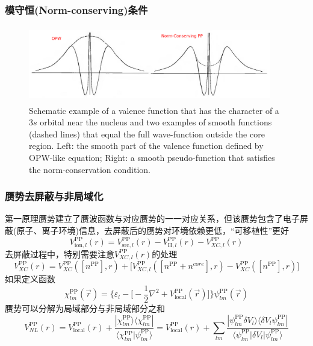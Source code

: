 \documentclass[cjk,slidestop,compress,mathserif,blue]{beamer}
\begin{document}
\frame
{
	\frametitle{模守恒\textrm{(Norm-conserving)}条件}
\begin{figure}[h!]
\centering
\vspace*{-0.10in}
\includegraphics[height=1.30in,width=4.17in,viewport=0 0 1150 350,clip]{Figures/Pseudo-OPW_NCPP.png}
\caption{\tiny \textrm{Schematic example of a valence function that has the character of a $3s$ orbital near the nucleus and two examples of smooth functions (dashed lines) that equal the full wave-function outside the core region. Left: the smooth part of the valence function defined by OPW-like equation; Right: a smooth pseudo-function that satisfies the norm-conservation condition.}}%
\label{Pseudo-OPW_NCPP}
\end{figure}
}

\frame
{
	\frametitle{赝势去屏蔽与非局域化}
	第一原理赝势建立了赝波函数与对应赝势的一一对应关系，但该赝势包含了电子屏蔽(原子、离子环境)信息，去屏蔽后的赝势对环境依赖更低，“可移植性”更好
	$$V_{\mathrm{ion},l}^{\mathrm{PP}}(r)=V_{\mathrm{src},l}^{\mathrm{PP}}(r)-V_{\mathrm{H},l}^{\mathrm{PP}}(r)-V_{XC,l}^{\mathrm{PP}}(r)$$
	去屏蔽过程中，特别需要注意$V_{XC,l}^{\mathrm{PP}}(r)$的处理
	$$V_{XC}^{\mathrm{PP}}(r)=V_{XC}^{\mathrm{PP}}([n^{\mathrm{PP}}],r)+\big[V_{XC,l}^{\mathrm{PP}}([n^{\mathrm{PP}}+n^{core}],r)-V_{XC}^{\mathrm{PP}}([n^{\mathrm{PP}}],r)\big]$$
	如果定义函数
	$$\chi_{lm}^{\mathrm{PP}}(\vec r)=\bigg\{\varepsilon_l-\bigg[-\dfrac12\nabla^2+V_{\mathrm{local}}^{\mathrm{PP}}(\vec r)\bigg]\bigg\}\psi_{lm}^{\mathrm{PP}}(\vec r)$$
	赝势可以分解为局域部分与非局域部分之和
	$$V_{NL}^{\mathrm{PP}}(r)=V_{\mathrm{local}}^{\mathrm{PP}}(r)+\dfrac{|\chi_{lm}^{\mathrm{PP}}\rangle\langle\chi_{lm}^{\mathrm{PP}}|}{\langle\chi_{lm}^{\mathrm{PP}}|\psi_{lm}^{\mathrm{PP}}\rangle}=V_{\mathrm{local}}^{\mathrm{PP}}(r)+\sum_{lm}\dfrac{|\psi_{lm}^{\mathrm{PP}}\delta V_l\rangle\langle\delta V_l\psi_{lm}^{\mathrm{PP}}|}{\langle\psi_{lm}^{\mathrm{PP}}|\delta V_l|\psi_{lm}^{\mathrm{PP}}\rangle}$$
}
\end{document}
